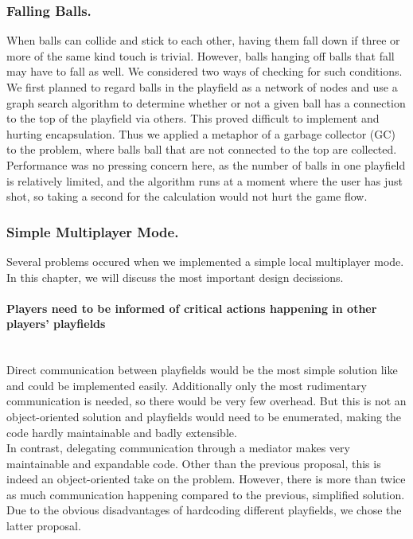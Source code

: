 \subsubsection{Falling Balls.}
\label{sec:garbage}
When balls can collide and stick to each other, having them fall down 
if three or more of the same kind touch is trivial. However, balls 
hanging off balls that fall may have to fall as well. We considered 
two ways of checking for such conditions. We first planned to regard balls in the 
playfield as a network of nodes and use a graph search algorithm to determine 
whether or not a given ball has a connection to the top of the playfield via 
others. This proved difficult to implement and hurting encapsulation. Thus 
we applied a metaphor of a garbage collector (GC) to the problem, where balls
ball that are not connected to the top are collected. Performance was no pressing 
concern here, as the number of balls in one playfield is relatively limited, 
and the algorithm runs at a moment where the user has just shot, so taking a second 
for the calculation would not hurt the game flow.

\subsubsection{Simple Multiplayer Mode.}
\label{sec:playfield}
Several problems occured when we implemented a simple local multiplayer mode. In this chapter, 
we will discuss the most important design decissions.
%
  \paragraph{Players need to be informed of critical actions happening in other players' playfields}
  ~\\
    Direct communication between playfields would be the most simple solution like and 
    could be implemented easily. Additionally only the most rudimentary communication is needed,
    so there would be very few overhead. But this is not an object-oriented solution and playfields 
    would need to be enumerated, making the code hardly maintainable and badly extensible.\\
    In contrast, delegating communication through a mediator makes very maintainable and
    expandable code. Other than the previous proposal, this is indeed an object-oriented 
    take on the problem. However, there is more than twice as much communication happening 
    compared to the previous, simplified solution. Due to the obvious disadvantages of 
    hardcoding different playfields, we chose the latter proposal.

